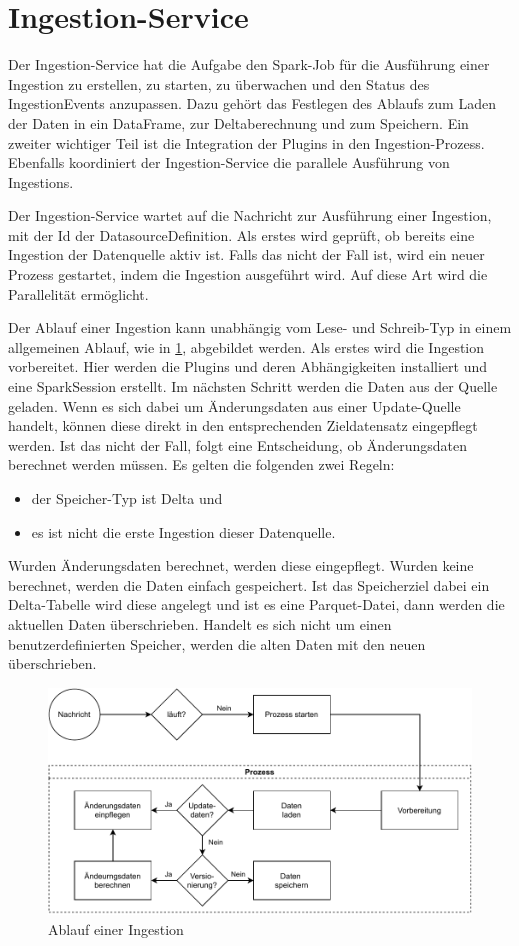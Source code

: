 \section{Ingestion-Service}
\label{sec:entw-ingestion}

Der Ingestion-Service hat die Aufgabe den Spark-Job für die Ausführung einer Ingestion zu erstellen, zu starten, zu überwachen und den Status des IngestionEvents anzupassen.
Dazu gehört das Festlegen des Ablaufs zum Laden der Daten in ein DataFrame, zur Deltaberechnung und zum Speichern.
Ein zweiter wichtiger Teil ist die Integration der Plugins in den Ingestion-Prozess.
Ebenfalls koordiniert der Ingestion-Service die parallele Ausführung von Ingestions.

Der Ingestion-Service wartet auf die Nachricht zur Ausführung einer Ingestion, mit der Id der DatasourceDefinition.
Als erstes wird geprüft, ob bereits eine Ingestion der Datenquelle aktiv ist.
Falls das nicht der Fall ist, wird ein neuer Prozess gestartet, indem die Ingestion ausgeführt wird.
Auf diese Art wird die Parallelität ermöglicht.

Der Ablauf einer Ingestion kann unabhängig vom Lese- und Schreib-Typ in einem allgemeinen Ablauf, wie in \cref{fig:ingestion-ablauf}, abgebildet werden.
Als erstes wird die Ingestion vorbereitet.
Hier werden die Plugins und deren Abhängigkeiten installiert und eine SparkSession erstellt.
Im nächsten Schritt werden die Daten aus der Quelle geladen.
Wenn es sich dabei um Änderungsdaten aus einer Update-Quelle handelt, können diese direkt in den entsprechenden Zieldatensatz eingepflegt werden.
Ist das nicht der Fall, folgt eine Entscheidung, ob Änderungsdaten berechnet werden müssen.
Es gelten die folgenden zwei Regeln: \begin{itemize}
    \item der Speicher-Typ ist Delta und
    \item es ist nicht die erste Ingestion dieser Datenquelle.
\end{itemize}
Wurden Änderungsdaten berechnet, werden diese eingepflegt.
Wurden keine berechnet, werden die Daten einfach gespeichert.
Ist das Speicherziel dabei ein Delta-Tabelle wird diese angelegt und ist es eine Parquet-Datei, dann werden die aktuellen Daten überschrieben.
Handelt es sich nicht um einen benutzerdefinierten Speicher, werden die alten Daten mit den neuen überschrieben.

\begin{figure}
    \centering
    \includegraphics[width=\textwidth]{Grafiken/Entwicklung-Ingestion-Ablauf.pdf}
    \caption{Ablauf einer Ingestion}
    \label{fig:ingestion-ablauf}
\end{figure}